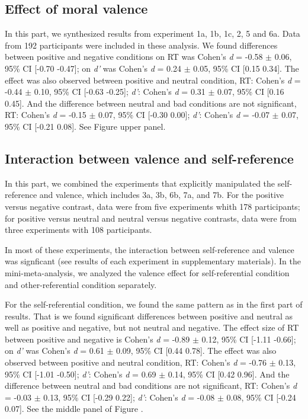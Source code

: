 \documentclass[man]{apa6}
\begin{document}
\hypertarget{effect-of-moral-valence}{%
\subsection{Effect of moral valence}\label{effect-of-moral-valence}}

In this part, we synthesized results from experiment 1a, 1b, 1c, 2, 5 and 6a. Data from 192 participants were included in these analysis. We found differences between positive and negative conditions on RT was Cohen's \emph{d} = -0.58 \(\pm\) 0.06, 95\% CI {[}-0.70 -0.47{]}; on \emph{d'} was Cohen's \emph{d} = 0.24 \(\pm\) 0.05, 95\% CI {[}0.15 0.34{]}. The effect was also observed between positive and neutral condition, RT: Cohen's \emph{d} = -0.44 \(\pm\) 0.10, 95\% CI {[}-0.63 -0.25{]}; \emph{d'}: Cohen's \emph{d} = 0.31 \(\pm\) 0.07, 95\% CI {[}0.16 0.45{]}. And the difference between neutral and bad conditions are not significant, RT: Cohen's \emph{d} = -0.15 \(\pm\) 0.07, 95\% CI {[}-0.30 0.00{]}; \emph{d'}: Cohen's \emph{d} = -0.07 \(\pm\) 0.07, 95\% CI {[}-0.21 0.08{]}. See Figure upper panel.

\hypertarget{interaction-between-valence-and-self-reference}{%
\subsection{Interaction between valence and self-reference}\label{interaction-between-valence-and-self-reference}}

In this part, we combined the experiments that explicitly manipulated the self-reference and valence, which includes 3a, 3b, 6b, 7a, and 7b. For the positive versus negative contrast, data were from five experiments whith 178 participants; for positive versus neutral and neutral versus negative contrasts, data were from three experiments with 108 participants.

In most of these experiments, the interaction between self-reference and valence was signficant (see results of each experiment in supplementary materials). In the mini-meta-analysis, we analyzed the valence effect for self-referential condition and other-referential condition separately.

For the self-referential condition, we found the same pattern as in the first part of results. That is we found significant differences between positive and neutral as well as positive and negative, but not neutral and negative. The effect size of RT between positive and negative is Cohen's \emph{d} = -0.89 \(\pm\) 0.12, 95\% CI {[}-1.11 -0.66{]}; on \emph{d'} was Cohen's \emph{d} = 0.61 \(\pm\) 0.09, 95\% CI {[}0.44 0.78{]}. The effect was also observed between positive and neutral condition, RT: Cohen's \emph{d} = -0.76 \(\pm\) 0.13, 95\% CI {[}-1.01 -0.50{]}; \emph{d'}: Cohen's \emph{d} = 0.69 \(\pm\) 0.14, 95\% CI {[}0.42 0.96{]}. And the difference between neutral and bad conditions are not significant, RT: Cohen's \emph{d} = -0.03 \(\pm\) 0.13, 95\% CI {[}-0.29 0.22{]}; \emph{d'}: Cohen's \emph{d} = -0.08 \(\pm\) 0.08, 95\% CI {[}-0.24 0.07{]}. See the middle panel of Figure .
\end{document}
